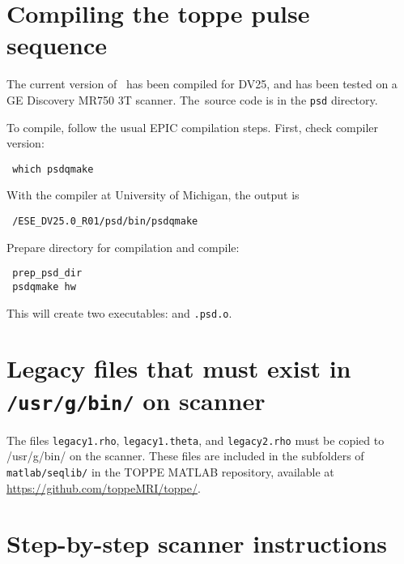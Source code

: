 \section{Compiling the toppe pulse sequence}

The current version of \toppe~has been compiled for DV25, and has been tested on a GE Discovery MR750 3T scanner.
The\toppe~source code is in the \texttt{psd} directory.

To compile, follow the usual EPIC compilation steps.
First, check compiler version:
\vspace{-10pt}
\begin{lstlisting}
 which psdqmake
\end{lstlisting}
With the compiler at University of Michigan, the output is 
\vspace{-10pt}
\begin{lstlisting}
 /ESE_DV25.0_R01/psd/bin/psdqmake
\end{lstlisting}

Prepare directory for compilation and compile:
\vspace{-10pt}
\begin{lstlisting}
 prep_psd_dir
 psdqmake hw
\end{lstlisting}
This will create two executables: {\tt \psdname} and {\tt \psdname.psd.o}.


\section{Legacy files that must exist in \texttt{/usr/g/bin/} on scanner}

The files {\tt legacy1.rho}, {\tt legacy1.theta}, and {\tt legacy2.rho} must be copied to /usr/g/bin/ on the scanner.
These files are included in the subfolders of {\tt matlab/seqlib/} in the TOPPE MATLAB repository, available at \url{https://github.com/toppeMRI/toppe/}.



\section{Step-by-step scanner instructions}

